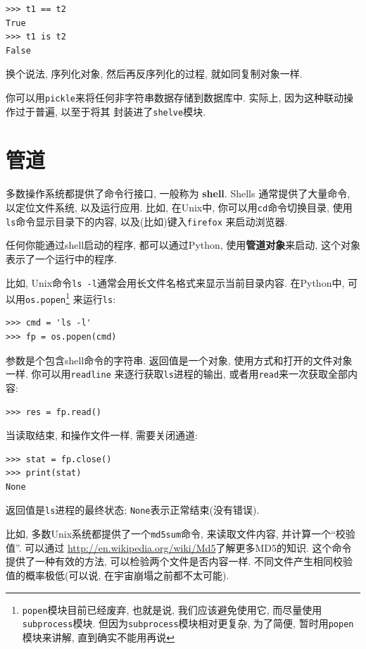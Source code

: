 \documentclass[10pt]{book}
\begin{document}
\begin{verbatim}
>>> t1 == t2
True
>>> t1 is t2
False
\end{verbatim}
%
换个说法, 序列化对象, 然后再反序列化的过程, 就如同复制对象一样. 

你可以用{\tt pickle}来将任何非字符串数据存储到数据库中. 
实际上, 因为这种联动操作过于普遍, 以至于将其
封装进了{\tt shelve}模块.  


\section{管道}

多数操作系统都提供了命令行接口, 一般称为 {\bf shell}.
Shells 通常提供了大量命令, 以定位文件系统, 以及运行应用. 
比如, 在Unix中, 你可以用{\tt cd}命令切换目录, 
使用{\tt ls}命令显示目录下的内容, 以及(比如)键入{\tt firefox} 来启动浏览器. 

任何你能通过shell启动的程序, 都可以通过Python, 使用{\bf 管道对象}来启动, 这个对象表示了一个运行中的程序. 

比如, Unix命令{\tt ls -l}通常会用长文件名格式来显示当前目录内容. 
在Python中, 可以用{\tt os.popen}\footnote{{\tt popen}模块目前已经废弃, 
也就是说, 我们应该避免使用它, 而尽量使用{\tt subprocess}模块. 
但因为{\tt subprocess}模块相对更复杂, 为了简便, 
暂时用{\tt popen}模块来讲解, 直到确实不能用再说} 来运行{\tt ls}:

\begin{verbatim}
>>> cmd = 'ls -l'
>>> fp = os.popen(cmd)
\end{verbatim}
%
参数是个包含shell命令的字符串. 
返回值是一个对象, 使用方式和打开的文件对象一样. 
你可以用{\tt readline} 来逐行获取{\tt ls}进程的输出, 
或者用{\tt read}来一次获取全部内容:

\begin{verbatim}
>>> res = fp.read()
\end{verbatim}
%
当读取结束, 和操作文件一样, 需要关闭通道:

\begin{verbatim}
>>> stat = fp.close()
>>> print(stat)
None
\end{verbatim}
%
返回值是{\tt ls}进程的最终状态;
{\tt None}表示正常结束(没有错误).

比如, 多数Unix系统都提供了一个{\tt md5sum}命令, 
来读取文件内容, 并计算一个``校验值''. 
可以通过 \url{http://en.wikipedia.org/wiki/Md5}了解更多MD5的知识. 
这个命令提供了一种有效的方法, 可以检验两个文件是否内容一样. 
不同文件产生相同校验值的概率极低(可以说, 在宇宙崩塌之前都不太可能). 
\end{document}
